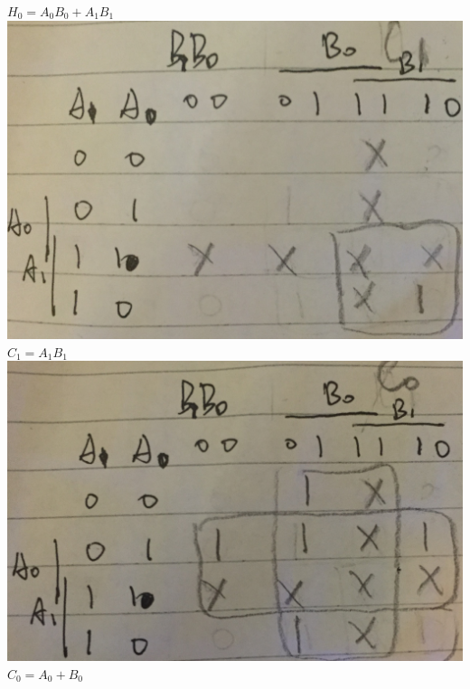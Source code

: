 \documentclass[10pt,twoside,a4paper]{article}
\begin{document}
\begin{enumerate}
$H_0 =A_0 B_0 + A_1 B_1$\newline
\includegraphics[scale=0.1]{7C1.JPG} 
$C_1 =A_1 B_1$\newline
\includegraphics[scale=0.09]{7C0.JPG} 
$C_0 =A_0 + B_0$\newline


\end{enumerate}
\end{document}

